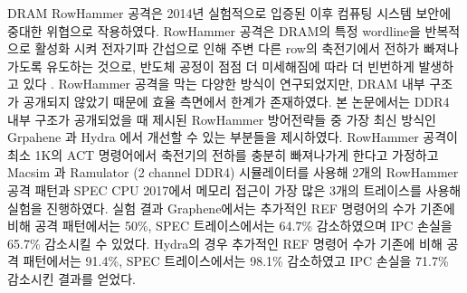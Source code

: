 \begin{KoreanAbstract}
  DRAM RowHammer 공격은 2014년 \cite{FlippingBits} 실험적으로 입증된 이후 컴퓨팅 시스템 보안에 
  중대한 위협으로 작용하였다. RowHammer 공격은 DRAM의 특정 wordline을 반복적으로 활성화 시켜 전자기파 
  간섭으로 인해 주변 다른 row의 축전기에서 전하가 빠져나가도록 유도하는 것으로, 반도체 공정이 점점 더 
  미세해짐에 따라 더 빈번하게 발생하고 있다 \cite{Revisiting}. RowHammer 공격을 막는 다양한 방식이 
  연구되었지만, DRAM 내부 구조가 공개되지 않았기 때문에 효율 측면에서 한계가 존재하였다. 
  본 논문에서는 DDR4 내부 구조가 공개되었을 때 제시된 RowHammer 방어전략들 중 가장 최신 방식인
   Grpahene \cite{Graphene} 과 Hydra \cite{Hydra} 에서 개선할 수 있는 부분들을 제시하였다. 
   RowHammer 공격이 최소 1K의 ACT 명령어에서 축전기의 전하를 충분히 빠져나가게 한다고 가정하고 
   Macsim \cite{MACSIM} 과 Ramulator \cite{RAMULATOR} (2 channel DDR4) 시뮬레이터를 사용해 
   2개의 RowHammer 공격 패턴과 SPEC CPU 2017에서 메모리 접근이 가장 많은 3개의 트레이스를 사용해 실험을 진행하였다.
    실험 결과 Graphene에서는 추가적인 REF 명령어의 수가 기존에 비해 공격 패턴에서는 50\%, SPEC 트레이스에서는 
    64.7\% 감소하였으며 IPC 손실을 65.7\% 감소시킬 수 있었다. 
    Hydra의 경우 추가적인 REF 명령어 수가 기존에 비해 공격 패턴에서는 91.4\%, SPEC 트레이스에서는 98.1\% 감소하였고 IPC 손실을 
    71.7\% 감소시킨 결과를 얻었다. 
\end{KoreanAbstract}
